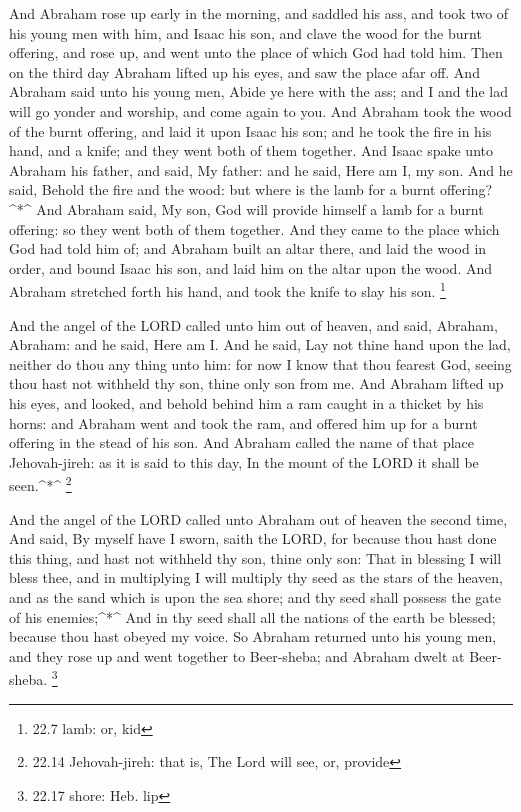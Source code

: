  And Abraham rose up early in the morning, and saddled his
ass, and took two of his young men with him, and Isaac his son, and
clave the wood for the burnt offering, and rose up, and went unto the
place of which God had told him.  Then on the third day
Abraham lifted up his eyes, and saw the place afar off.  And
Abraham said unto his young men, Abide ye here with the ass; and I and
the lad will go yonder and worship, and come again to you. 
And Abraham took the wood of the burnt offering, and laid it upon Isaac
his son; and he took the fire in his hand, and a knife; and they went
both of them together.  And Isaac spake unto Abraham his
father, and said, My father: and he said, Here am I, my son. And he
said, Behold the fire and the wood: but where is the lamb for a burnt
offering?\^{}*\^{}  And Abraham said, My son, God will
provide himself a lamb for a burnt offering: so they went both of them
together.  And they came to the place which God had told him
of; and Abraham built an altar there, and laid the wood in order, and
bound Isaac his son, and laid him on the altar upon the wood.
 And Abraham stretched forth his hand, and took the knife
to slay his son. \footnote{22.7 lamb: or, kid}

 And the angel of the LORD called unto him out of heaven,
and said, Abraham, Abraham: and he said, Here am I.  And he
said, Lay not thine hand upon the lad, neither do thou any thing unto
him: for now I know that thou fearest God, seeing thou hast not withheld
thy son, thine only son from me.  And Abraham lifted up his
eyes, and looked, and behold behind him a ram caught in a thicket by his
horns: and Abraham went and took the ram, and offered him up for a burnt
offering in the stead of his son.  And Abraham called the
name of that place Jehovah-jireh: as it is said to this day, In the
mount of the LORD it shall be seen.\^{}*\^{} \footnote{22.14
  Jehovah-jireh: that is, The Lord will see, or, provide}

 And the angel of the LORD called unto Abraham out of
heaven the second time,  And said, By myself have I sworn,
saith the LORD, for because thou hast done this thing, and hast not
withheld thy son, thine only son:  That in blessing I will
bless thee, and in multiplying I will multiply thy seed as the stars of
the heaven, and as the sand which is upon the sea shore; and thy seed
shall possess the gate of his enemies;\^{}*\^{}  And in thy
seed shall all the nations of the earth be blessed; because thou hast
obeyed my voice.  So Abraham returned unto his young men,
and they rose up and went together to Beer-sheba; and Abraham dwelt at
Beer-sheba. \footnote{22.17 shore: Heb. lip}

